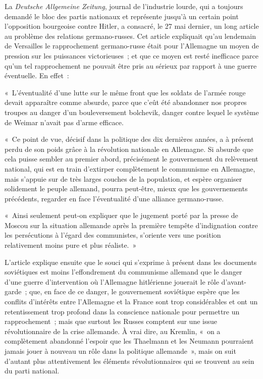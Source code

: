 \documentclass[french,twoside]{book} %
\begin{document}
La {\itshape Deutsche Allgemeine Zeitung}, journal de l'industrie lourde, qui a toujours demandé le bloc des partis nationaux et représente jusqu’à un certain point l'opposition bourgeoise contre Hitler, a consacré, le 27 mai dernier, un long article au problème des relations germano-russes. Cet article expliquait qu'au lendemain de Versailles le rapprochement germano-russe était pour l'Allemagne un moyen de pression sur les puissances victorieuses ; et que ce moyen est resté inefficace parce qu'un tel rapprochement ne pouvait être pris au sérieux par rapport à une guerre éventuelle. En effet :\par
« L'éventualité d'une lutte sur le même front que les soldats de l'armée rouge devait apparaître comme absurde, parce que c'eût été abandonner nos propres troupes au danger d'un bouleversement bolchevik, danger contre lequel le système de Weimar n'avait pas d'arme efficace.\par
« Ce point de vue, décisif dans la politique des dix dernières années, a à présent perdu de son poids grâce à la révolution nationale en Allemagne. Si absurde que cela puisse sembler au premier abord, précisément le gouverne­ment du relèvement national, qui est en train d'extirper complètement le communisme en Allemagne, mais s'appuie sur de très larges couches de la population, et espère organiser solidement le peuple allemand, pourra peut-être, mieux que les gouvernements précédents, regarder en face l'éventualité d'une alliance germano-russe.\par
« Ainsi seulement peut-on expliquer que le jugement porté par la presse de Moscou sur la situation allemande après la première tempête d'indignation contre les persécutions à l'égard des communistes, s'oriente vers une position relativement moins pure et plus réaliste. »\par
L'article explique ensuite que le souci qui s'exprime à présent dans les documents soviétiques est moins l'effondrement du communisme allemand que le danger d'une guerre d'intervention où l'Allemagne hitlérienne jouerait le rôle d'avant-garde ; que, en face de ce danger, le gouvernement soviétique espère que les conflits d'intérêts entre l'Allemagne et la France sont trop consi­dérables et ont un retentissement trop profond dans la conscience nationale pour permettre un rapprochement ; mais que surtout les Russes comptent sur une issue révolutionnaire de la crise allemande. À vrai dire, au Kremlin, « on a complètement abandonné l'espoir que les Thaelmann et les Neumann pourraient jamais jouer à nouveau un rôle dans la politique allemande », mais on suit d'autant plus attentivement les éléments révolutionnaires qui se trouvent au sein du parti national.\par
\end{document}
